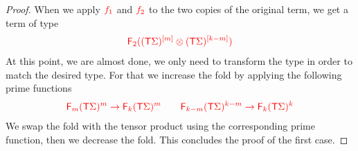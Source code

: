 \begin{proof}
When we apply $\ranked{f_1}$ and $\ranked{f_2}$ to the two copies of the original term, we get a term of type 
\begin{align*}
\ranked{ \reduce 2 (\mati m {(\tmonad \Sigma)}\otimes  \mati {k-m} {(\tmonad\Sigma)})}
\end{align*}
At this point, we are almost done, we only need to transform the type in order to match the desired type. For that we increase the fold by applying the following prime functions
\begin{align*}
\ranked{\reduce m (\tmonad \Sigma)^m \to \reduce k (\tmonad \Sigma)^m \qquad \reduce {k-m} (\tmonad \Sigma)^{k-m} \to \reduce k (\tmonad \Sigma)^{k} }
\end{align*}
We swap the fold with the tensor product using the corresponding prime function, then we decrease the fold. This concludes the proof of the first case.
\medskip


\end{proof}
